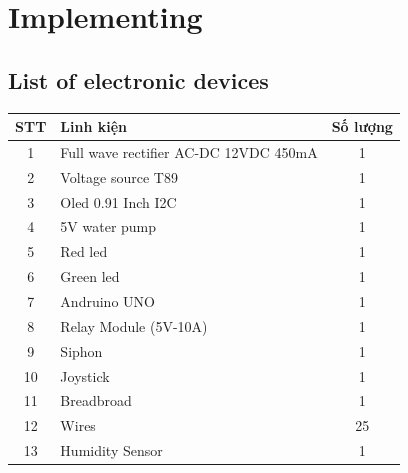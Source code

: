\documentclass[12pt]{article}
\begin{document}
    \section{Implementing}
        \subsection{List of electronic devices}
            \begin{table}[H]
                \centering
                \begin{tabular}{|c|l|c|}
\hline
\multicolumn{1}{|l|}{STT} & Linh kiện                             & \multicolumn{1}{l|}{Số lượng} \\ \hline
1                         & Full wave rectifier AC-DC 12VDC 450mA & 1                             \\ \hline
2                         & Voltage source T89                    & 1                             \\ \hline
3                         & Oled 0.91 Inch I2C                    & 1                             \\ \hline
4                         & 5V water pump                         & 1                             \\ \hline
5                         & Red led                               & 1                             \\ \hline
6                         & Green led                             & 1                             \\ \hline
7                         & Andruino UNO                          & 1                             \\ \hline
8                         & Relay Module (5V-10A)                 & 1                             \\ \hline
9                         & Siphon                                & 1                             \\ \hline
10                        & Joystick                              & 1                             \\ \hline
11                        & Breadbroad                            & 1                             \\ \hline
12                        & Wires                                 & 25                            \\ \hline
13                        & Humidity Sensor                       & 1                             \\ \hline
\end{tabular}
\end{table}
\end{document}
